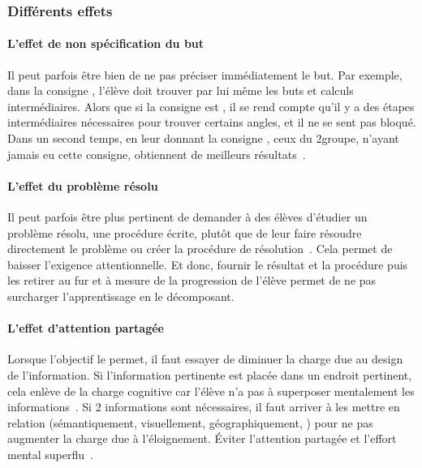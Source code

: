         \subsubsection{Différents effets}\label{sec:effect}
            \paragraph{L’effet de non spécification du but}
                Il peut parfois être bien de ne pas préciser immédiatement le but. Par exemple, dans la consigne , l’élève doit trouver par lui même les buts et calculs intermédiaires. 
                Alors que si la consigne est , il se rend compte qu’il y a des étapes intermédiaires nécessaires pour trouver certains angles, et il ne se sent pas bloqué.
                Dans un second temps, en leur donnant la consigne , ceux du 2\nd groupe, n'ayant jamais eu cette consigne, obtiennent de meilleurs résultats~.%
            \paragraph{L’effet du problème résolu}
                Il peut parfois être plus pertinent de demander à des élèves d’étudier un problème résolu, une procédure écrite, plutôt que de leur faire résoudre directement le problème ou créer la procédure de résolution~. Cela permet de baisser l’exigence attentionnelle. Et donc, fournir le résultat et la procédure puis les retirer au fur et à mesure de la progression de l'élève permet de ne pas surcharger l'apprentissage en le décomposant.
            \paragraph{L’effet d’attention partagée}
                Lorsque l’objectif le permet, il faut essayer de diminuer la charge due au design de l’information. Si l’information pertinente est placée dans un endroit pertinent, cela enlève de la charge cognitive car l’élève n’a pas à superposer mentalement les informations~. Si 2 informations sont nécessaires, il faut arriver à les mettre en relation (sémantiquement, visuellement, géographiquement, \etc) pour ne pas augmenter la charge due à l’éloignement. Éviter l’attention partagée et l’effort mental superflu~.
